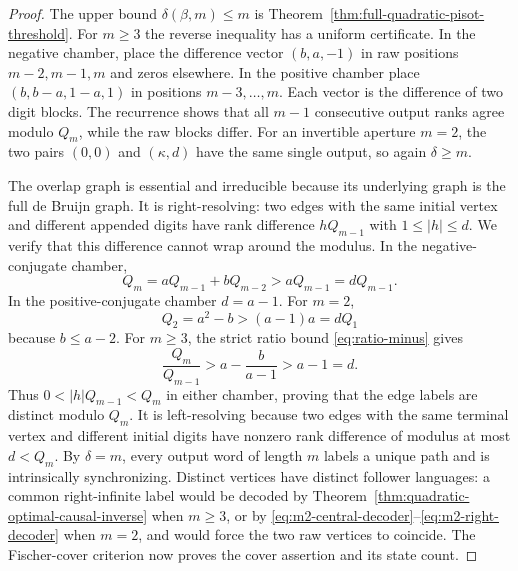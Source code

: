 \begin{proof}
The upper bound $\delta(\beta,m)\le m$ is
Theorem~\ref{thm:full-quadratic-pisot-threshold}.  For $m\ge3$ the reverse
inequality has a uniform certificate.  In the negative chamber, place the
difference vector $(b,a,-1)$ in raw positions $m-2,m-1,m$ and zeros
elsewhere.  In the positive chamber place
$(b,b-a,1-a,1)$ in positions $m-3,\ldots,m$.  Each vector is the difference
of two digit blocks.  The recurrence shows that all $m-1$ consecutive output
ranks agree modulo $Q_m$, while the raw blocks differ.  For an invertible
aperture $m=2$, the two pairs $(0,0)$ and $(\kappa,d)$ have the same single
output, so again $\delta\ge m$.

The overlap graph is essential and irreducible because its underlying graph
is the full de Bruijn graph.  It is right-resolving: two edges with the same
initial vertex and different appended digits have rank difference
$hQ_{m-1}$ with $1\le|h|\le d$.  We verify that this difference cannot wrap
around the modulus.  In the negative-conjugate chamber,
\[
Q_m=aQ_{m-1}+bQ_{m-2}>aQ_{m-1}=dQ_{m-1}.
\]
In the positive-conjugate chamber $d=a-1$.  For $m=2$,
\[
Q_2=a^2-b>(a-1)a=dQ_1
\]
because $b\le a-2$.  For $m\ge3$, the strict ratio bound
\eqref{eq:ratio-minus} gives
\[
\frac{Q_m}{Q_{m-1}}>a-\frac{b}{a-1}>a-1=d.
\]
Thus $0<|h|Q_{m-1}<Q_m$ in either chamber, proving that the edge labels are
distinct modulo $Q_m$.  It is
left-resolving because two edges with the same terminal vertex and different
initial digits have nonzero rank difference of modulus at most $d<Q_m$.
By $\delta=m$, every output word of length $m$ labels a unique path and is
intrinsically synchronizing.  Distinct vertices have distinct follower
languages: a common right-infinite label would be decoded by
Theorem~\ref{thm:quadratic-optimal-causal-inverse} when $m\ge3$, or by
\eqref{eq:m2-central-decoder}--\eqref{eq:m2-right-decoder} when $m=2$, and
would force the two raw vertices to coincide.  The Fischer-cover criterion
now proves the cover assertion and its state count.


\end{proof}
